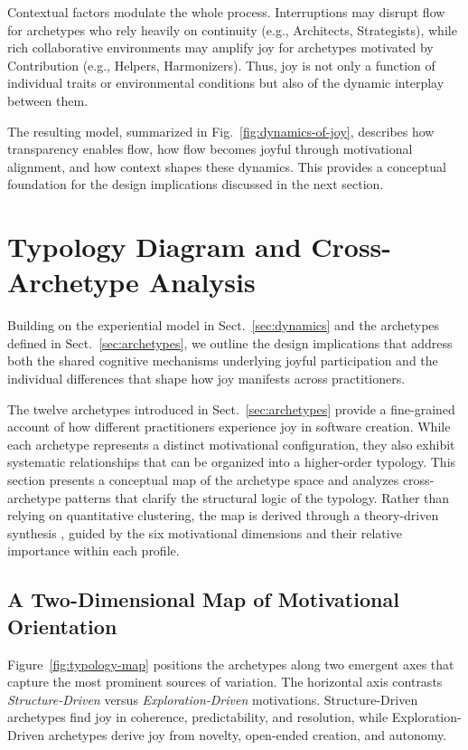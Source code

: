 \documentclass[12pt]{elsarticle}
\begin{document}
Contextual factors modulate the whole process. Interruptions may disrupt flow 
for archetypes who rely heavily on continuity (e.g., Architects, Strategists), 
while rich collaborative environments may amplify joy for archetypes motivated 
by Contribution (e.g., Helpers, Harmonizers). Thus, joy is not only a function 
of individual traits or environmental conditions but also of the dynamic interplay 
between them.

The resulting model, summarized in Fig.~\ref{fig:dynamics-of-joy}, describes 
how transparency enables flow, how flow becomes joyful through motivational 
alignment, and how context shapes these dynamics. This provides a conceptual 
foundation for the design implications discussed in the next section.



\section{Typology Diagram and Cross-Archetype Analysis}\label{sec:typology}
Building on the experiential model in Sect.~\ref{sec:dynamics} and the archetypes 
defined in Sect.~\ref{sec:archetypes}, we outline the design implications that 
address both the shared cognitive mechanisms underlying joyful participation and 
the individual differences that shape how joy manifests across practitioners.

The twelve archetypes introduced in Sect.~\ref{sec:archetypes} provide a fine-grained account of
how different practitioners experience joy in software creation. While each
archetype represents a distinct motivational configuration, they also exhibit
systematic relationships that can be organized into a higher-order typology.
This section presents a conceptual map of the archetype space and analyzes
cross-archetype patterns that clarify the structural logic of the typology.
Rather than relying on quantitative clustering, the map is derived through a
theory-driven synthesis \cite{cooper2004inmates, pruit2006persona}, guided by 
the six motivational dimensions and their relative importance within each
profile.

\subsection{A Two-Dimensional Map of Motivational Orientation}

Figure~\ref{fig:typology-map} positions the archetypes along two emergent
axes that capture the most prominent sources of variation. The horizontal axis
contrasts \emph{Structure-Driven} versus \emph{Exploration-Driven}
motivations. Structure-Driven archetypes find joy in coherence, predictability,
and resolution, while Exploration-Driven archetypes derive joy from novelty,
open-ended creation, and autonomy.
\end{document}
